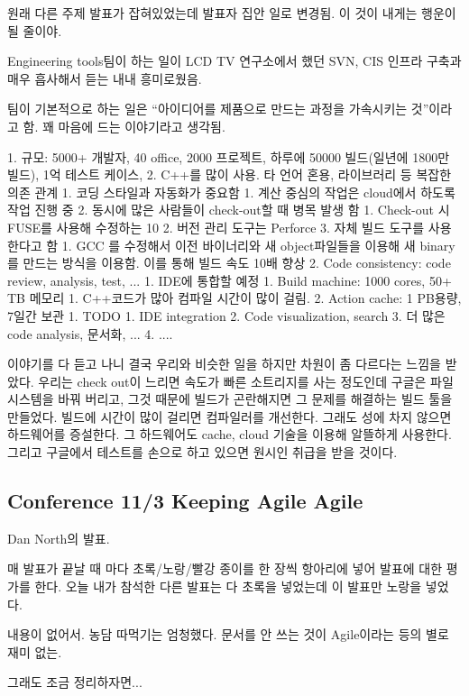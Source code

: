 \documentclass[a4paper]{article}
\begin{document}
원래 다른 주제 발표가 잡혀있었는데 발표자 집안 일로 변경됨. 이 것이
내게는 행운이 될 줄이야.
 
Engineering tools팀이 하는 일이 LCD TV 연구소에서 했던 SVN, CIS 인프라
구축과 매우 흡사해서 듣는 내내 흥미로웠음.
 
팀이 기본적으로 하는 일은 ``아이디어를 제품으로 만드는 과정을 가속시키는
것''이라고 함. 꽤 마음에 드는 이야기라고 생각됨.
 
1. 규모: 5000+ 개발자, 40 office, 2000 프로젝트, 하루에 50000 빌드(일년에 1800만 빌드), 1억  테스트 케이스,  
2. C++를 많이 사용. 타 언어 혼용, 라이브러리 등 복잡한 의존 관계
1. 코딩 스타일과 자동화가 중요함
1. 계산 중심의 작업은 cloud에서 하도록 작업 진행 중
2. 동시에 많은 사람들이 check-out할 때 병목 발생 함
1. Check-out 시 FUSE를 사용해 수정하는 10%
2. 버전 관리 도구는 Perforce
3. 자체 빌드 도구를 사용한다고 함
1. GCC 를 수정해서  이전 바이너리와 새 object파일들을 이용해 새 binary를 만드는 방식을 이용함. 이를 통해 빌드 속도 10배 향상
2. Code consistency: code review, analysis, test, ...
1. IDE에 통합할 예정
1. Build machine: 1000 cores, 50+ TB 메모리
1. C++코드가 많아 컴파일 시간이 많이 걸림.
2. Action cache: 1 PB용량, 7일간 보관
1. TODO
1. IDE integration 
2. Code  visualization, search
3. 더 많은 code analysis, 문서화, ...
4. .... 
 
이야기를 다 듣고 나니 결국 우리와 비슷한 일을 하지만 차원이 좀 다르다는
느낌을 받았다. 우리는 check out이 느리면 속도가 빠른 소트리지를 사는
정도인데 구글은 파일시스템을 바꿔 버리고, 그것 때문에 빌드가 곤란해지면
그 문제를 해결하는 빌드 툴을 만들었다. 빌드에 시간이 많이 걸리면
컴파일러를 개선한다. 그래도 성에 차지 않으면 하드웨어를 증설한다. 그
하드웨어도 cache, cloud 기술을 이용해 알뜰하게 사용한다. 그리고
구글에서 테스트를 손으로 하고 있으면 원시인 취급을 받을 것이다.

\subsection{Conference 11/3 Keeping Agile Agile}
 
Dan North의 발표.  

매 발표가 끝날 때 마다 초록/노랑/빨강 종이를 한 장씩 항아리에 넣어
발표에 대한 평가를 한다.  오늘 내가 참석한 다른 발표는 다 초록을
넣었는데 이 발표만 노랑을 넣었다.
 
내용이 없어서. 농담 따먹기는 엄청했다. 문서를 안 쓰는 것이 Agile이라는 등의 별로 재미 없는.
 
그래도 조금 정리하자면...
 
\end{document}
